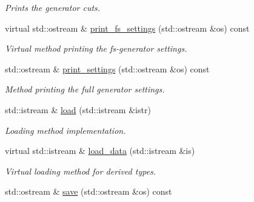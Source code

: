 \begin{DoxyCompactItemize}
\begin{DoxyCompactList}\small\item\em Prints the generator cuts. \end{DoxyCompactList}\item 
\hypertarget{a00441_ad624214090c7af05dea86e49898e416f}{virtual std\-::ostream \& \hyperlink{a00441_ad624214090c7af05dea86e49898e416f}{print\-\_\-fs\-\_\-settings} (std\-::ostream \&os) const }\label{a00441_ad624214090c7af05dea86e49898e416f}

\begin{DoxyCompactList}\small\item\em Virtual method printing the fs-\/generator settings. \end{DoxyCompactList}\item 
\hypertarget{a00441_afe993ba556fa067fcb43d991d3de9bb9}{std\-::ostream \& \hyperlink{a00441_afe993ba556fa067fcb43d991d3de9bb9}{print\-\_\-settings} (std\-::ostream \&os) const }\label{a00441_afe993ba556fa067fcb43d991d3de9bb9}

\begin{DoxyCompactList}\small\item\em Method printing the full generator settings. \end{DoxyCompactList}\item 
\hypertarget{a00441_a3e7b2e301d82bfe11d7b37b2663e692b}{std\-::istream \& \hyperlink{a00441_a3e7b2e301d82bfe11d7b37b2663e692b}{load} (std\-::istream \&istr)}\label{a00441_a3e7b2e301d82bfe11d7b37b2663e692b}

\begin{DoxyCompactList}\small\item\em Loading method implementation. \end{DoxyCompactList}\item 
\hypertarget{a00441_a1a5227173fe7c8fba373680d81b25e3d}{virtual std\-::istream \& \hyperlink{a00441_a1a5227173fe7c8fba373680d81b25e3d}{load\-\_\-data} (std\-::istream \&is)}\label{a00441_a1a5227173fe7c8fba373680d81b25e3d}

\begin{DoxyCompactList}\small\item\em Virtual loading method for derived types. \end{DoxyCompactList}\item 
\hypertarget{a00441_a3742b76cbc8e96062bd3ba76bb4d5a38}{std\-::ostream \& \hyperlink{a00441_a3742b76cbc8e96062bd3ba76bb4d5a38}{save} (std\-::ostream \&os) const }\label{a00441_a3742b76cbc8e96062bd3ba76bb4d5a38}


\end{DoxyCompactItemize}
